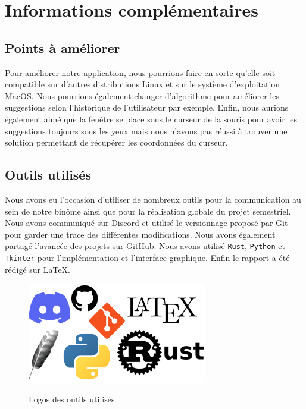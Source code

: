 \documentclass[a4paper, 11pt]{report}
\newcommand{\langage}[1]{\texttt{#1}}
\begin{document}
{\chapter{Informations complémentaires}

\section{Points à améliorer}

Pour améliorer notre application, nous pourrions faire en sorte qu'elle soit compatible sur d'autres distributions Linux et sur le système d'exploitation MacOS. Nous pourrions également changer d'algorithme pour améliorer les suggestions selon l'historique de l'utilisateur par exemple. Enfin, nous aurions également aimé que la fenêtre se place sous le curseur de la souris pour avoir les suggestions toujours sous les yeux mais nous n'avons pas réussi à trouver une solution permettant de récupérer les coordonnées du curseur.


\section{Outils utilisés}

Nous avons eu l'occasion d'utiliser de  nombreux outils pour la communication au sein de notre binôme ainsi que pour la réalisation globale du projet semestriel. Nous avons communiqué sur Discord et utilisé le versionnage proposé par Git pour garder une trace des différentes modifications. Nous avons également partagé l'avancée des projets sur GitHub. Nous avons utilisé \langage{Rust}, \langage{Python} et \langage{Tkinter} pour l'implémentation et l'interface graphique. Enfin le rapport a été rédigé sur \LaTeX{}.

\begin{figure}[H]
	\begin{center}
		{\includegraphics[width=0.7\textwidth]{images/outils.png}}
	\end{center}
	\caption{Logos des outils utilisés}
	\label{fig:outils}
\end{figure}
}
\end{document}
